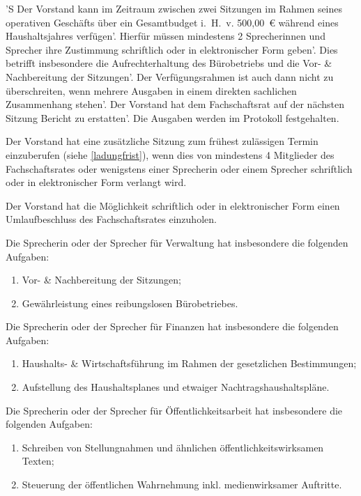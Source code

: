 \documentclass[%
    parskip=half,
]{scrartcl}
\newcommand{\edit}[1]{{\color{red} #1}}
\newcommand{\add}[1]{{\color{blue} #1}}
\begin{document}
\begin{contract}
'S \edit{Der Vorstand kann} im Zeitraum zwischen zwei Sitzungen im Rahmen \edit{seines} operativen Geschäfts
über ein Gesamtbudget i.~H.~v. \edit{500,00}~€ \add{während eines Haushaltsjahres} verfügen'. Hierfür müssen mindestens
2 \edit{Sprecherinnen und Sprecher} ihre Zustimmung schriftlich oder in elektronischer Form geben'. Dies betrifft
insbesondere die Aufrechterhaltung des Bürobetriebs und die Vor- \& Nachbereitung der Sitzungen'. Der Verfügungsrahmen
ist auch dann nicht zu überschreiten, wenn mehrere Ausgaben in einem direkten sachlichen Zusammenhang stehen'. 
\edit{Der Vorstand hat} dem Fachschaftsrat auf der nächsten Sitzung Bericht zu erstatten'. Die Ausgaben
werden im Protokoll festgehalten.

\edit{Der Vorstand hat} eine zusätzliche Sitzung zum frühest zulässigen Termin einzuberufen \add{(siehe 
\ref{ladungfrist})}, wenn dies von mindestens 4 Mitglieder des Fachschaftsrates oder \edit{wenigstens einer Sprecherin 
oder einem Sprecher} schriftlich oder in elektronischer Form verlangt wird.

\edit{Der Vorstand hat} die Möglichkeit schriftlich oder in elektronischer Form einen Umlaufbeschluss des 
Fachschaftsrates einzuholen.

\edit{Die Sprecherin oder der Sprecher} für Verwaltung hat insbesondere die folgenden Aufgaben:
\begin{enumerate}[\qquad a)]
    \item Vor- \& Nachbereitung der Sitzungen;
    \item Gewährleistung eines reibungslosen Bürobetriebes.
\end{enumerate}

\edit{Die Sprecherin oder der Sprecher} für Finanzen hat insbesondere die folgenden Aufgaben:
\begin{enumerate}[\qquad a)]
    \item Haushalts- \& Wirtschaftsführung im Rahmen der gesetzlichen Bestimmungen;
    \item Aufstellung des Haushaltsplanes und etwaiger Nachtragshaushaltspläne.
\end{enumerate}

\add{Die Sprecherin oder der Sprecher für Öffentlichkeitsarbeit hat insbesondere die folgenden Aufgaben:
\begin{enumerate}[\qquad a)]
    \item Schreiben von Stellungnahmen und ähnlichen öffentlichkeitswirksamen Texten;
    \item Steuerung der öffentlichen Wahrnehmung inkl. medienwirksamer Auftritte.
\end{enumerate}}

\end{contract}
\end{document}
